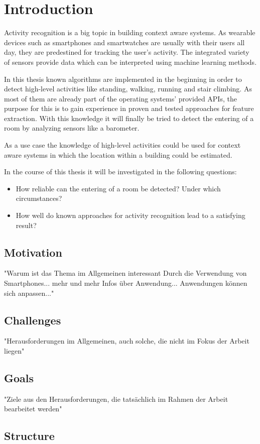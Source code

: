 \chapter{Introduction}
\label{cha:Introduction}

Activity recognition is a big topic in building context aware systems. As wearable devices such as smartphones and smartwatches are usually with their users all day, they are predestined for tracking the user's activity. The integrated variety of sensors provide data which can be interpreted using machine learning methods. 

In this thesis known algorithms are implemented in the beginning in order to detect high-level activities like standing, walking, running and stair climbing. As most of them are already part of the operating systems' provided APIs, the purpose for this is to gain experience in proven and tested approaches for feature extraction. With this knowledge it will finally be tried to detect the entering of a room by analyzing sensors like a barometer. 

As a use case the knowledge of high-level activities could be used for context aware systems in which the location within a building could be estimated. 

In the course of this thesis it will be investigated in the following questions:
\begin{itemize}
	\item How reliable can the entering of a room be detected? Under which circumstances?
	\item How well do known approaches for activity recognition lead to a satisfying result?
\end{itemize}

\section{Motivation}
"Warum ist das Thema im Allgemeinen interessant
Durch die Verwendung von Smartphones... mehr und mehr Infos über Anwendung... Anwendungen können sich anpassen..."

\section{Challenges}
"Herausforderungen im Allgemeinen, auch solche, die nicht im Fokus der Arbeit liegen"

\section{Goals}
"Ziele aus den Herausforderungen, die tatsächlich im Rahmen der Arbeit bearbeitet werden"

\section{Structure}
